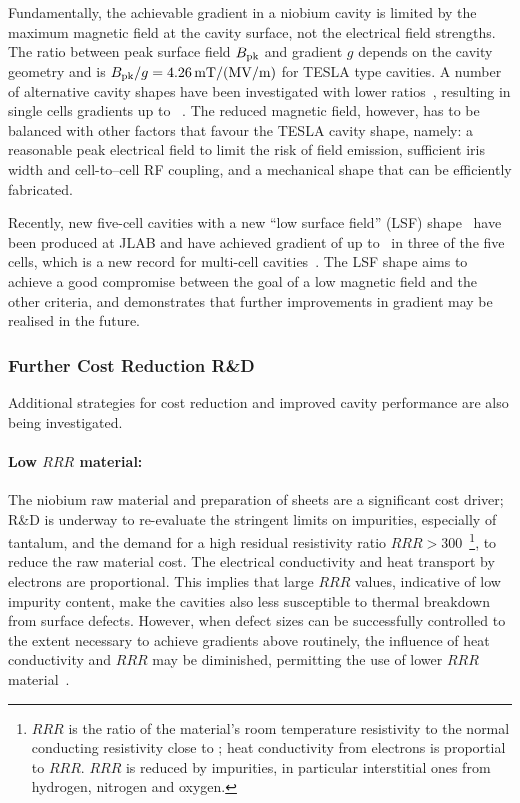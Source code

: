 Fundamentally, the achievable gradient in a niobium cavity is limited by the maximum magnetic field at the cavity surface, not the electrical field strengths.
The ratio between peak surface field $B_{\mathrm{pk}}$ and gradient $g$ depends on the cavity geometry and is $B_{\mathrm{pk}}/g = 4.26\,{\mathrm{mT / (MV/m)}}$ for TESLA type cavities.
A number of alternative cavity shapes have been investigated with lower ratios~\cite{Geng:2006wf},
resulting in single cells gradients up to ~\cite{Eremeev:2007zza}.
The reduced magnetic field, however, has to be balanced with other factors that favour the TESLA cavity shape, namely: a reasonable peak electrical field to limit the risk of field emission, sufficient iris width and cell-to--cell RF coupling, and a mechanical shape that can be efficiently fabricated.

Recently, new five-cell cavities with a new ``low surface field'' (LSF) shape~\cite{Li:2008a} have been produced at JLAB and have achieved gradient of up to~ in three of the five cells, which is a new record for multi-cell cavities~\cite{bib:Geng:2018.lcws}. 
The LSF shape aims to achieve a good compromise between the goal of a low magnetic field and the other criteria, and demonstrates that further improvements in gradient may be realised  in the future.


\subsubsection{Further Cost Reduction R\&D}

Additional strategies for cost reduction and improved cavity performance are also being investigated.

\paragraph{Low $RRR$ material:}

The niobium raw material and preparation of sheets  are a significant cost driver; R\&D is underway to re-evaluate the stringent limits on impurities, especially of tantalum, and the demand for a high residual resistivity ratio $RRR > 300$~\footnote{$RRR$ is the ratio of the material's room temperature resistivity to the normal conducting resistivity close to ; heat conductivity from electrons is proportial to $RRR$. $RRR$ is reduced by impurities, in particular interstitial ones  from hydrogen, nitrogen and oxygen.}, to reduce the raw material cost.  The electrical 
conductivity and heat transport by electrons are proportional.  This implies that 
large $RRR$ values, indicative of low impurity content, make the cavities also 
less susceptible to thermal breakdown from surface defects.
However, when defect sizes can be successfully controlled to the extent necessary to achieve gradients above  routinely, the influence of heat conductivity and $RRR$ may be diminished, permitting the use of lower $RRR$ material~\cite{bib:Kubo:2018.ttc}.

